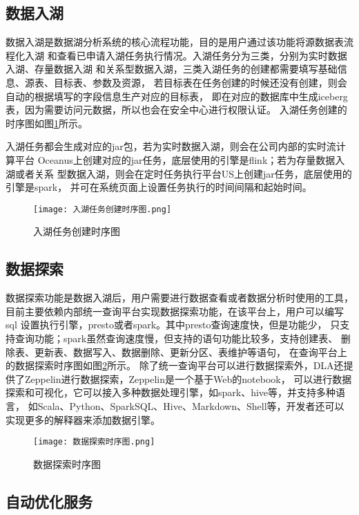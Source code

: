 \subsection{数据入湖}

数据入湖是数据湖分析系统的核心流程功能，目的是用户通过该功能将源数据表流程化入湖
和查看已申请入湖任务执行情况。入湖任务分为三类，分别为实时数据入湖、存量数据入湖
和关系型数据入湖，三类入湖任务的创建都需要填写基础信息、源表、目标表、参数及资源，
若目标表在任务创建的时候还没有创建，则会自动的根据填写的字段信息生产对应的目标表，
即在对应的数据库中生成iceberg表，因为需要访问元数据，所以也会在安全中心进行权限认证。
入湖任务创建的时序图如图\ref{fig:入湖任务创建时序图}所示。

入湖任务都会生成对应的jar包，若为实时数据入湖，则会在公司内部的实时流计算平台
Oceanus上创建对应的jar任务，底层使用的引擎是flink；若为存量数据入湖或者关系
型数据入湖，则会在定时任务执行平台US上创建jar任务，底层使用的引擎是spark，
并可在系统页面上设置任务执行的时间间隔和起始时间。

\begin{figure}[H]
  \centering
  \texttt{[image: 入湖任务创建时序图.png]}
  \caption{入湖任务创建时序图}
  \label{fig:入湖任务创建时序图}
\end{figure}

\subsection{数据探索}

数据探索功能是数据入湖后，用户需要进行数据查看或者数据分析时使用的工具，
目前主要依赖内部统一查询平台实现数据探索功能，在该平台上，用户可以编写sql
设置执行引擎，presto或者spark。其中presto查询速度快，但是功能少，
只支持查询功能；spark虽然查询速度慢，但支持的语句功能比较多，支持创建表、
删除表、更新表、数据写入、数据删除、更新分区、表维护等语句，
在查询平台上的数据探索时序图如图\ref{fig:数据探索时序图}所示。
除了统一查询平台可以进行数据探索外，DLA还提供了Zeppelin进行数据探索，Zeppelin是一个基于Web的notebook，
可以进行数据探索和可视化，它可以接入多种数据处理引擎，如spark、hive等，并支持多种语言，
如Scala、Python、SparkSQL、Hive、Markdown、Shell等，开发者还可以实现更多的解释器来添加数据引擎。

\begin{figure}[H]
  \centering
  \texttt{[image: 数据探索时序图.png]}
  \caption{数据探索时序图}
  \label{fig:数据探索时序图}
\end{figure}

\subsection{自动优化服务}

